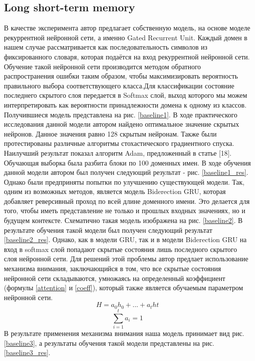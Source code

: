     \subsection{Long short-term memory}\label{lstm_class_exp}
    В качестве эксперимента автор предлагает собственную модель, на основе моделе рекуррентной нейронной сети, а именно Gated Recurrent Unit. Каждый домен в нашем случае рассматривается как последовательность символов из фиксированного словаря, которая подаётся на вход рекуррентной нейронной сети. Обучение такой нейронной сети производится методом обратного распространения ошибки таким образом, чтобы максимизировать вероятность правильного выбора соответствующего класса.Для классификации состояние последнего скрытого слоя передается в Softmax слой, выход которого мы можем интерпретировать как вероятности принадлежности домена к одному из классов. Получившиеся модель представлена на рис. \ref{baseline1}.
    В ходе практического исследования данной модели автором найдено оптимальное значение скрытых нейронов. Данное значения равно 128 скрытым нейронам.
    Также были протестированы различные алгоритмы стохастического градиентного спуска. Наилучший результат показал алгоритм Adam, предложенный в статье [18].
    Обучающая выборка была разбита блоки по 100 доменных имен. В ходе обучения данной модели автором был получен следующий результат - рис. \ref{baseline1_res}.
    Однако были предприняты попытки по улучшению существующей модели. Так, одним из возможных методов, является модель Biderection GRU, которая добавляет реверсивный проход по всей длине доменного имени. Это делается для того, чтобы иметь представление не только и прошлых входных значениях, но и будущем контексте. Схематично такая модель изображена на рис. \ref{baseline2}.
    В результате обучения такой модели был получен следующий результат \ref{baseline2_res}.
    Однако, как в модели GRU, так и в модели Biderection GRU на вход в softmax слой попадают скрытые состояния лишь последного скрытого слоя нейронной сети. Для решений этой проблемы автор предлает использование механизма внимания, заключающийся в том, что все скрытые состояния нейронной сети складываются, умножаясь на определенный коэффициент (формулы \ref{attention} и \ref{coeff}), который также является обучаемым параметром нейронной сети.
    \begin{equation}\label{attention}
    H = a_{0}h_{0}+...+a_{t}h{t}
    \end{equation}
    \begin{equation}\label{coeff}
    \sum_{i=1}^{t} a_{i}=1
    \end{equation}
    В результате применения механизма внимания наша модель принимает вид рис. \ref{baseline3}, а результаты обучения такой модели представлены на рис. \ref{baseline3_res}.

